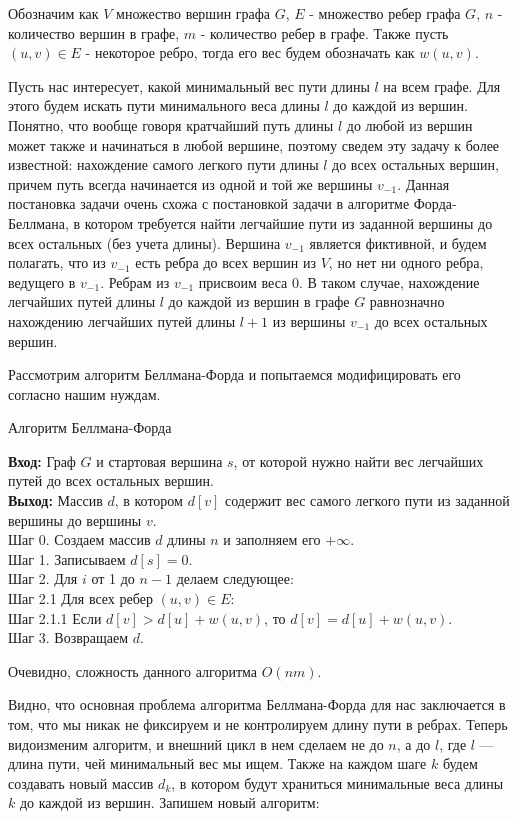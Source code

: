 \documentclass[a4paper,12pt]{report}
\theoremstyle{plain} %
\theoremstyle{definition}
\theoremstyle{remark}
\begin{document}
\begin{large}
Обозначим как $V$ множество вершин графа $G$, $E$ - множество ребер графа $G$, $n$ - количество вершин в графе, $m$ - количество ребер в графе. Также пусть $(u, v) \in E$ - некоторое ребро, тогда его вес будем обозначать как $w(u, v)$.

Пусть нас интересует, какой минимальный вес пути длины $l$ на всем графе. Для этого будем искать пути минимального веса длины $l$ до каждой из вершин. Понятно, что вообще говоря кратчайший путь длины $l$ до любой из вершин может также и начинаться в любой вершине, поэтому сведем эту задачу к более известной: нахождение самого легкого пути длины $l$ до всех остальных вершин, причем путь всегда начинается из одной и той же вершины $v_{-1}$. Данная постановка задачи очень схожа с постановкой задачи в алгоритме Форда-Беллмана, в котором требуется найти легчайшие пути из заданной вершины до всех остальных (без учета длины). Вершина $v_{-1}$ является фиктивной, и будем полагать, что из $v_{-1}$ есть ребра до всех вершин из $V$, но нет ни одного ребра, ведущего в $v_{-1}$. Ребрам из $v_{-1}$ присвоим веса 0. В таком случае, нахождение легчайших путей длины $l$ до каждой из вершин в графе $G$ равнозначно нахождению легчайших путей длины $l+1$ из вершины $v_{-1}$ до всех остальных вершин.

 Рассмотрим алгоритм Беллмана-Форда и попытаемся модифицировать его согласно нашим нуждам.

\begin{algorithm}[H]
\caption{Алгоритм Беллмана-Форда}
\label{diff_graph_construct}
\textbf{Вход:} Граф $G$ и стартовая вершина $s$, от которой нужно найти вес легчайших путей до всех остальных вершин.\\
\textbf{Выход:} Массив $d$, в котором $d[v]$ содержит вес самого легкого пути из заданной вершины до вершины $v$.\\
Шаг 0. Создаем массив $d$ длины $n$ и заполняем его $+\infty$. \\
Шаг 1. Записываем $d[s] = 0$.\\
Шаг 2. Для $i$ от 1 до $n-1$ делаем следующее:\\
Шаг 2.1 Для всех ребер $(u, v) \in E:$\\
Шаг 2.1.1 Если $d[v] > d[u] + w(u,v)$, то $d[v] = d[u] + w(u,v).$\\
Шаг 3. Возвращаем $d$.\\
\end{algorithm}

Очевидно, сложность данного алгоритма $O(nm)$.

Видно, что основная проблема алгоритма Беллмана-Форда для нас заключается в том, что мы никак не фиксируем и не контролируем длину пути в ребрах. Теперь видоизменим алгоритм, и внешний цикл в нем сделаем не до $n$, а до $l$, где $l$ --- длина пути, чей минимальный вес мы ищем. Также на каждом шаге $k$ будем создавать новый массив $d_k$, в котором будут храниться минимальные веса длины $k$ до каждой из вершин. Запишем новый алгоритм:


\end{large}
\end{document}
